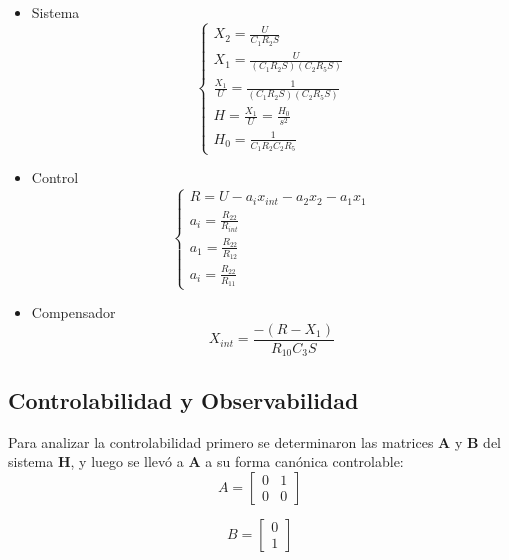 \documentclass[letterpaper, 10 pt, conference]{ieeeconf}  %
\begin{document}
\begin{itemize}
  \item Sistema
    \begin{equation} \label{eq:trans_H}
      \begin{cases}
        X_2 = \frac{U}{C_1R_2S}                     \\
        X_1 = \frac{U}{(C_1R_2S)(C_2R_5S)}          \\
        \frac{X_1}{U} = \frac{1}{(C_1R_2S)(C_2R_5S)} \\
        H = \frac{X_1}{U} = \frac{H_0}{s^2}           \\
        H_0 = \frac{1}{C_1R_2C_2R_5}
      \end{cases}
    \end{equation}
  \item Control
    \begin{equation}
      \begin{cases}
        R = U - a_ix_{int} - a_2x_2 - a_1x_1             \\
        a_i = \frac{R_{22}}{R_{int}}                     \\
        a_1 = \frac{R_{22}}{R_{12}}                     \\
        a_i = \frac{R_{22}}{R_{11}}
      \end{cases}
    \end{equation}
  \item Compensador
    \begin{equation}
      X_{int} = \frac{-(R-X_1)}{R_{10}C_3S}
    \end{equation}
\end{itemize}

\subsection{Controlabilidad y Observabilidad}
Para analizar la controlabilidad primero se determinaron las matrices \textbf{A} y \textbf{B} del sistema \textbf{H}, y luego se llevó a \textbf{A} a su forma canónica controlable:
\begin{equation} \label{mat:a_de_h_cano_contr}
  A =
  \begin{bmatrix}
    0 & 1\\
    0 & 0
  \end{bmatrix}
\end{equation} 

\begin{equation} \label{mat:b_de_h_cano_contr}
  B =
  \begin{bmatrix}
    0\\
    1
  \end{bmatrix}
\end{equation} 
\end{document}
